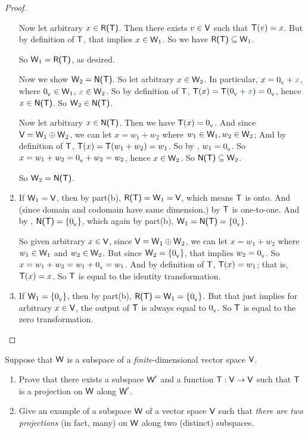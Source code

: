 \begin{proof}
\begin{enumerate}
Now let arbitrary \(x \in \textsf{R(T)}\).
Then there exists \(v \in \textsf{V}\) such that \(\textsf{T}(v) = x\).
But by definition of \(\textsf{T}\), that implies \(x \in \textsf{W}_1\).
So we have \(\textsf{R(T)} \subseteq \textsf{W}_1\).

So \(\textsf{W}_1 = \textsf{R(T)}\), as desired.

Now we show \(\textsf{W}_2 = \textsf{N(T)}\).
So let arbitrary \(x \in \textsf{W}_2\).
In particular, \(x = \OV + \BLUE{x}\), where \(0_{_{\textsf{V}}} \in \textsf{W}_1\), \(\BLUE{x} \in \W_2\).
So by definition of \(\textsf{T}\), \(\T(x) = \T(\OV + \BLUE{x}) = \OV\), hence \(x \in \textsf{N(T)}\).
So \(\textsf{W}_2 \in \textsf{N(T)}\).

Now let arbitrary \(x \in \textsf{N(T)}\).
Then we have \(\textsf{T}(x) = 0_{_{\textsf{V}}}\). 
And since \(\textsf{V} = \textsf{W}_1 \oplus \textsf{W}_2\), we can let \(x = w_1 + w_2\) where \(w_1 \in \textsf{W}_1, w_2 \in \textsf{W}_2\);
And by definition of \(\textsf{T}\), \(\textsf{T}(x) = \textsf{T}(w_1 + w_2) = w_1\).
So by , \(w_1 = 0_{_{\textsf{V}}}\).
So \(x = w_1 + w_2 = 0_{_{\textsf{V}}} + w_2 = w_2\), hence \(x \in \textsf{W}_2\).
So \(\textsf{N(T)} \subseteq \textsf{W}_2\).

So \(\textsf{W}_2 = \textsf{N(T)}\).

\item
If \(\textsf{W}_1 = \textsf{V}\), then by part(b), \(\textsf{R(T)} = \textsf{W}_1 = \textsf{V}\), which means \(\textsf{T}\) is onto.
And (since domain and codomain have same dimension,) by  \(\textsf{T}\) is one-to-one.
And by , \(\textsf{N(T)} = \{ 0_{_{\textsf{V}}} \}\), which again by part(b), \(\textsf{W}_1 = \textsf{N(T)} = \{ 0_{_{\textsf{V}}} \}\).

So given arbitrary \(x \in \textsf{V}\), since \(\textsf{V} = \textsf{W}_1 \oplus \textsf{W}_2\), we can let \(x = w_1 + w_2\) where \(w_1 \in \textsf{W}_1\) and \(w_2 \in \textsf{W}_2\).
But since \(\textsf{W}_2 = \{ 0_{_{\textsf{V}}} \}\), that implies \(w_2 = 0_{_{\textsf{V}}}\).
So \(x = w_1 + w_2 = w_1 + 0_{_{\textsf{V}}} = w_1\).
And by definition of \(\textsf{T}\), \(\textsf{T}(x) = w_1\);
that is, \(\textsf{T}(x) = x\).
So \(\textsf{T}\) is equal to the identity transformation.

\item
If \(\textsf{W}_1 = \{ 0_{_{\textsf{V}}} \}\), then by part(b), \(\textsf{R(T)} = \textsf{W}_1 = \{ 0_{_{\textsf{V}}} \}\).
But that just implies for arbitrary \(x \in \textsf{V}\), the output of \(\textsf{T}\) is always equal to \(0_{_{\textsf{V}}}\).
So \(\textsf{T}\) is equal to the zero transformation.
\end{enumerate}
\end{proof}

\begin{exercise} \label{exercise 2.1.28}
Suppose that \(\textsf{W}\) is a subspace of a \emph{finite}-dimensional vector space \(\textsf{V}\).
\begin{enumerate}
\item Prove that there exists a subspace \(\textsf{W}'\) and a function \(\textsf{T} : \textsf{V} \to \textsf{V}\) such that \(\textsf{T}\) is a projection on \(\textsf{W}\) along \(\textsf{W}'\).
\item Give an example of a subspace \(\textsf{W}\) of a vector space \(\textsf{V}\) such that \emph{there are two projections} (in fact, many) on \(\textsf{W}\) along two (distinct) subspaces.
\end{enumerate}
\end{exercise}

